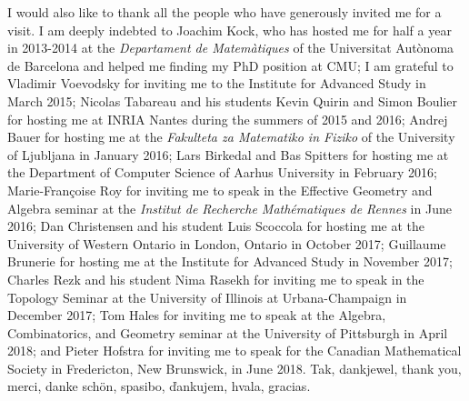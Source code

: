 I would also like to thank all the people who have generously invited me for a visit. I am deeply indebted to Joachim Kock, who has hosted me for half a year in 2013-2014 at the \textit{Departament de Matemàtiques} of the Universitat Autònoma de Barcelona and helped me finding my PhD position at CMU; I am grateful to Vladimir Voevodsky for inviting me to the Institute for Advanced Study in March 2015; Nicolas Tabareau and his students Kevin Quirin and Simon Boulier for hosting me at INRIA Nantes during the summers of 2015 and 2016; Andrej Bauer for hosting me at the \textit{Fakulteta za Matematiko in Fiziko} of the University of Ljubljana in January 2016; Lars Birkedal and Bas Spitters for hosting me at the Department of Computer Science of Aarhus University in February 2016; Marie-Françoise Roy for inviting me to speak in the Effective Geometry and Algebra seminar at the \textit{Institut de Recherche Mathématiques de Rennes} in June 2016; Dan Christensen and his student Luis Scoccola for hosting me at the University of Western Ontario in London, Ontario in October 2017; Guillaume Brunerie for hosting me at the Institute for Advanced Study in November 2017; Charles Rezk and his student Nima Rasekh for inviting me to speak in the Topology Seminar at the University of Illinois at Urbana-Champaign in December 2017; Tom Hales for inviting me to speak at the Algebra, Combinatorics, and Geometry seminar at the University of Pittsburgh in April 2018; and Pieter Hofstra for inviting me to speak for the Canadian Mathematical Society in Fredericton, New Brunswick, in June 2018. Tak, dankjewel, thank you, merci, danke sch\"on, spasibo, \v dankujem, hvala, gracias.


